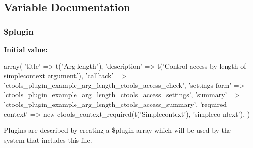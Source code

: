 \subsection{Variable Documentation}
\hypertarget{arg__length_8inc_ada8a7130088351710bb02ed622d6bf65}{
\subsubsection[{\$plugin}]{\setlength{\rightskip}{0pt plus 5cm}\$plugin}}
\label{arg__length_8inc_ada8a7130088351710bb02ed622d6bf65}
{\bfseries Initial value:}
\begin{DoxyCode}
 array(
  'title' => t("Arg length"),
  'description' => t('Control access by length of simplecontext argument.'),
  'callback' => 'ctools_plugin_example_arg_length_ctools_access_check',
  'settings form' => 'ctools_plugin_example_arg_length_ctools_access_settings',
  'summary' => 'ctools_plugin_example_arg_length_ctools_access_summary',
  'required context' => new ctools_context_required(t('Simplecontext'), 'simpleco
      ntext'),
)
\end{DoxyCode}
Plugins are described by creating a \$plugin array which will be used by the system that includes this file. 